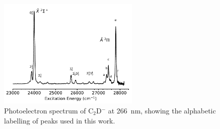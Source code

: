 \documentclass[journal=jacsat,manuscript=suppinfo]{achemso}
\begin{document}
\begin{figure}[th!]
	\includegraphics[width=0.6\textwidth]{figures/FigS2.pdf}
	\caption{Photoelectron spectrum of C$_2$D$^-$ at 266~nm, showing the alphabetic labelling of peaks used in this work.}
	\label{fig:2}
\end{figure}
\end{document}
